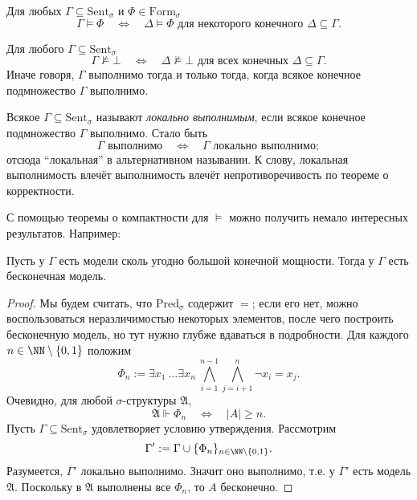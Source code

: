 \documentclass[12pt,a4paper]{article}
\newcommand{\Formul}{\ensuremath{\mathrm{Form}}\xspace}
\newcommand{\Pred}{\ensuremath{\mathrm{Pred}}\xspace}
\newcommand{\Sent}{\ensuremath{\mathrm{Sent}}\xspace}
\begin{document}
    \begin{theorem}
        Для любых $\Gamma \subseteq \Sent_\sigma$ и $\Phi \in \Formul_\sigma$
        \[
            \Gamma \vDash \Phi
            \quad \Longleftrightarrow \quad
            \Delta \vDash \Phi \text{ для некоторого конечного } \Delta \subseteq \Gamma.
        \]
    \end{theorem}

    \begin{corollary}
        Для любого $\Gamma \subseteq \Sent_\sigma$
        \[
            \Gamma \nvDash \bot
            \quad \Longleftrightarrow \quad
            \Delta \nvDash \bot \text{ для всех конечных } \Delta \subseteq \Gamma.
        \]
        Иначе говоря, $\Gamma$ выполнимо тогда и только тогда, когда всякое конечное подмножество $\Gamma$ выполнимо.
    \end{corollary}

    \begin{remark}
        Всякое $\Gamma \subseteq \Sent_\sigma$ называют \emph{локально выполнимым}, если всякое конечное подмножество $\Gamma$ выполнимо. Стало быть
        \[
            \Gamma \text{ выполнимо}
            \quad \Longleftrightarrow \quad
            \Gamma \text{ локально выполнимо};
        \]
        отсюда ``локальная'' в альтернативном назывании. К слову, локальная выполнимость влечёт выполнимость влечёт непротиворечивость по теореме о корректности.
    \end{remark}

    \begin{remark*}
        С помощью теоремы о компактности для $\vDash$ можно получить немало интересных результатов. Например:
    \end{remark*}

    \begin{statement}
        Пусть у $\Gamma$ есть модели сколь угодно большой конечной мощности. Тогда у $\Gamma$ есть бесконечная модель.
    \end{statement}

    \begin{proof}
        Мы будем считать, что $\Pred_\sigma$ содержит $=$; если его нет, можно воспользоваться неразличимостью некоторых элементов, после чего построить бесконечную модель, но тут нужно глубже вдаваться в подробности. Для каждого $n \in \NN \setminus \{0, 1\}$ положим
        \[\Phi_n := \exists x_1\ \dots \exists x_n\ \bigwedge_{i=1}^{n-1} \bigwedge_{j=i+1}^n \neg x_i = x_j.\]
        Очевидно, для любой $\sigma$-структуры $\mathfrak{A}$,
        \[
            \mathfrak{A} \Vdash \Phi_n
            \quad \Longleftrightarrow \quad
            |A| \geqslant n.
        \]
        Пусть $\Gamma \subseteq \Sent_\sigma$ удовлетворяет условию утверждения. Рассмотрим
        \[\Gamma' := \Gamma \cup \{\Phi_n\}_{n \in \NN \setminus \{0, 1\}}.\]
        Разумеется, $\Gamma'$ локально выполнимо. Значит оно выполнимо, т.е. у $\Gamma'$ есть модель $\mathfrak{A}$. Поскольку в $\mathfrak{A}$ выполнены все $\Phi_n$, то $A$ бесконечно.
    \end{proof}
\end{document}
